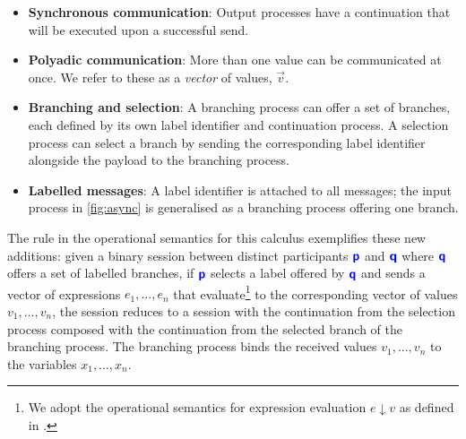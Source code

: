 \begin{itemize}
\item \textbf{Synchronous communication}: 
Output processes have a continuation that will be executed upon
a successful send.

\item \textbf{Polyadic communication}: 
More than one value can be communicated at once.
We refer to these as a \textit{vector} of values, $\vec v$.

\item \textbf{Branching and selection}: 
A branching process can offer a set of branches, 
each defined by its own label identifier and continuation process. 
A selection process can select a branch by 
sending the corresponding label identifier 
alongside the payload to the branching process.

\item \textbf{Labelled messages}: 
A label identifier is attached to all messages; 
the input process in \cref{fig:async}
is generalised as a branching process offering one branch.
\end{itemize}

The  rule in the operational semantics 
for this calculus exemplifies these new additions: 
given a binary session between distinct participants 
$\role{p}$ and $\role{q}$ 
where $\role{q}$ offers a set of labelled branches,
if $\role{p}$ selects a label offered by $\role{q}$ and 
sends a vector of expressions $e_1, \dots, e_n$ 
that evaluate\footnote{
We adopt the operational semantics for 
expression evaluation $e \downarrow v$ 
as defined in \cite{C406Lecture}.
} to the corresponding vector of values 
$v_1, \dots, v_n$, 
the session reduces to a session with 
the continuation from the selection process 
composed with the continuation from the selected branch 
of the branching process.
The branching process binds the received values
$v_1, \dots, v_n$ to the variables $x_1, \dots, x_n$.

\begin{prooftree}
\end{prooftree}

